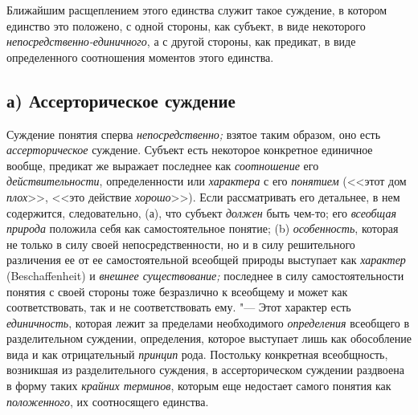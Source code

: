Ближайшим расщеплением этого единства служит такое суждение, в
котором единство это положено, с одной стороны, как субъект, в виде
некоторого
{\em непосредственно-единичного},
а с другой стороны, как предикат, в виде определенного
соотношения моментов этого единства.

\subsection[а) Ассерторическое суждение]{а) Ассерторическое суждение}
Суждение понятия сперва
{\em непосредственно;}
взятое таким образом, оно есть
{\em ассерторическое}
суждение. Субъект есть некоторое конкретное единичное вообще,
предикат же выражает последнее как
{\em соотношение} его
{\em действительности},
определенности или
{\em характера} с его
{\em понятием} (<<этот дом
{\em плох}>>, <<это
действие {\em хорошо}>>).
Если рассматривать его детальнее, в нем содержится,
следовательно, (а), что субъект
{\em должен} быть чем-то;
его {\em всеобщая природа}
положила себя как самостоятельное понятие; (b)
{\em особенность},
которая не только в силу своей непосредственности, но и в
силу решительного различения ее от ее самостоятельной всеобщей природы
выступает как {\em характер}
(Beschaf\-fenheit) и
{\em внешнее существование;}
последнее в силу самостоятельности понятия с своей стороны
тоже безразлично к всеобщему и может как соответствовать, так и не
соответствовать ему. "--- Этот характер есть
{\em единичность},
которая лежит за пределами необходимого
{\em определения}
всеобщего в разделительном суждении, определения, которое
выступает лишь как обособление вида и как отрицательный
{\em принцип} рода.
Постольку конкретная всеобщность, возникшая из разделительного суждения, в
ассерторическом суждении раздвоена в форму таких
{\em крайних терминов},
которым еще недостает самого понятия как
{\em положенного}, их
соотносящего
единства.

